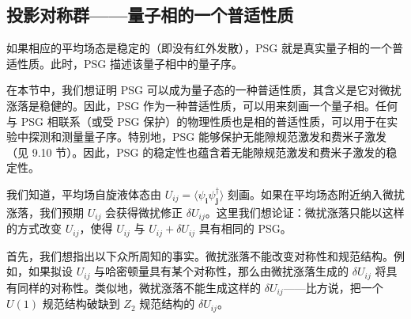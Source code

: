 
\subsection{投影对称群——量子相的一个普适性质}

\begin{keypoints}
\item 如果相应的平均场态是稳定的（即没有红外发散），PSG 就是真实量子相的一个普适性质。此时，PSG 描述该量子相中的量子序。
\end{keypoints}

在本节中，我们想证明 PSG 可以成为量子态的一种普适性质，其含义是它对微扰涨落是稳健的。因此，PSG 作为一种普适性质，可以用来刻画一个量子相。任何与 PSG 相联系（或受 PSG 保护）的物理性质也是相的普适性质，可以用于在实验中探测和测量量子序。特别地，PSG 能够保护无能隙规范激发和费米子激发（见 9.10 节）。因此，PSG 的稳定性也蕴含着无能隙规范激发和费米子激发的稳定性。

我们知道，平均场自旋液体态由 $U_{ij}=\langle\psi_{\pmb{i}}\psi_{\pmb{j}}^{\dagger}\rangle$ 刻画。如果在平均场态附近纳入微扰涨落，我们预期 $U_{ij}$ 会获得微扰修正 $\delta U_{ij}$。这里我们想论证：微扰涨落只能以这样的方式改变 $U_{ij}$，使得 $U_{ij}$ 与 $U_{ij}+\delta U_{ij}$ 具有相同的 PSG。

首先，我们想指出以下众所周知的事实。微扰涨落不能改变对称性和规范结构。例如，如果拟设 $U_{ij}$ 与哈密顿量具有某个对称性，那么由微扰涨落生成的 $\delta U_{ij}$ 将具有同样的对称性。类似地，微扰涨落不能生成这样的 $\delta U_{ij}$——比方说，把一个 $U(1)$ 规范结构破缺到 $Z_2$ 规范结构的 $\delta U_{ij}$。

